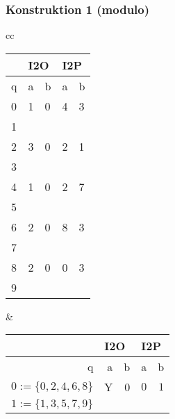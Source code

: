 \begin{frame}
  \frametitle{Konstruktion 1 (modulo)}
  \centering
  \begin{tabular}{cc}
    \begin{tabular}{|l|l|l|l|l|}
      \hline
      & \multicolumn{2}{l|}{I2O} & \multicolumn{2}{l|}{I2P} \\\hline
    q & a           & b          & a           & b          \\\hline\hline
    \cellcolor[HTML]{DAE8FC}0  & 1            &  0          &  4           &  3          \\\hline
    1 &             &            &             &            \\\hline
    \cellcolor[HTML]{DAE8FC}2 &  3           & 0           & 2            &  1          \\\hline
    3 &             &            &             &            \\\hline
    \cellcolor[HTML]{DAE8FC}4 &  1           & 0           & 2            &  7          \\\hline
    5 &             &            &             &            \\\hline
    \cellcolor[HTML]{DAE8FC}6 &  2           & 0           & 8            &  3          \\\hline
    7 &             &            &             &            \\\hline
    \cellcolor[HTML]{DAE8FC}8 &  2           & 0           & 0            &  3          \\\hline
    9 &             &            &             &           \\\hline
    \end{tabular}
    &
    \begin{tabular}{|r|r|r|r|r|}
      \hline
      
      & \multicolumn{2}{l|}{I2O} & \multicolumn{2}{l|}{I2P} \\\hline
    q & a           & b          & a           & b          \\\hline\hline
    \cellcolor[HTML]{DAE8FC}$0:=\{0,2,4,6,8\}$  & Y            & 0          & $0$ & $1$           \\\hline
    $1:=\{1,3,5,7,9\}$ &             &            &             &            \\\hline
    \end{tabular}
    \end{tabular}
\end{frame}


